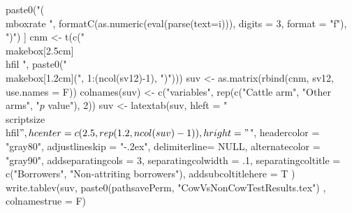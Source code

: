 \begin{Schunk}
\begin{Sinput}
    paste0("(\\mbox{rate }", formatC(as.numeric(eval(parse(text=i))), digits = 3, format = "f"), ")") ]
cnm <- t(c("\\makebox[2.5cm]{\\hfil }", 
  paste0("\\makebox[1.2cm]{(", 1:(ncol(sv12)-1), ")}")))
suv <- as.matrix(rbind(cnm, sv12, use.names = F))
colnames(suv) <- c("variables", rep(c("Cattle arm", "Other arms", "$p$ value"), 2))
suv <- latextab(suv, 
  hleft = "\\scriptsize\\hfil$", 
  hcenter = c(2.5, rep(1.2, ncol(suv)-1)), 
  hright = "$", 
  headercolor = "gray80", adjustlineskip = "-.2ex", delimiterline= NULL,
  alternatecolor = "gray90",
  addseparatingcols = 3, 
  separatingcolwidth = .1, 
  separatingcoltitle = c("Borrowers", "Non-attriting borrowers"),
  addsubcoltitlehere = T
  )
write.tablev(suv,  
  paste0(pathsavePerm, "CowVsNonCowTestResults.tex")
, colnamestrue = F)
\end{Sinput}
\end{Schunk}


